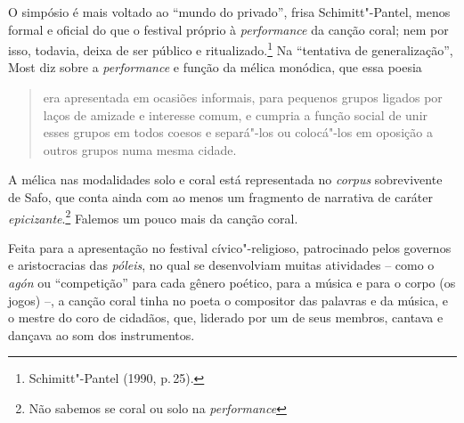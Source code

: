 O simpósio é mais voltado ao “mundo do privado”, frisa Schimitt"-Pantel, menos
formal e oficial do que o festival próprio à \textit{performance}
da canção coral; nem por isso, todavia, deixa de ser público e
ritualizado.\footnote{ Schimitt"-Pantel (1990, p.\,25).} Na
“tentativa de generalização”, Most diz sobre a \textit{performance} e função da
mélica monódica, que essa poesia 

\begin{quote}
era apresentada em ocasiões informais, para
pequenos grupos ligados por laços de amizade e interesse comum, e cumpria a
função social de unir esses grupos em todos coesos e separá"-los ou colocá"-los
em oposição a outros grupos numa mesma cidade.
\end{quote}

A mélica nas modalidades solo e coral está representada no \textit{corpus} sobrevivente
de Safo, que conta ainda com ao menos um fragmento de narrativa de
caráter \textit{epicizante}.\footnote{Não sabemos se coral ou solo na \textit{performance}} 
Falemos um pouco mais da canção coral.

Feita para a apresentação no festival cívico"-religioso, patrocinado
pelos governos e aristocracias das \textit{póleis}, no qual se
desenvolviam muitas atividades -- como o \textit{agón} ou ``competição'' 
para cada gênero poético, para a música e para o corpo (os jogos) \mbox{--,} a canção coral tinha no poeta o compositor das palavras e
da música, e o mestre do coro de cidadãos, que, liderado por um de seus
membros, cantava e dançava ao som dos instrumentos.


